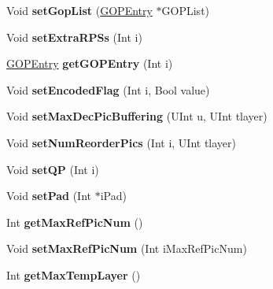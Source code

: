 \begin{DoxyCompactItemize}
\mbox{\label{class_t_enc_cfg_a10e0dcedeed1f5d039ebc30837f1358c}} 
Void {\bfseries set\+Gop\+List} (\hyperlink{struct_g_o_p_entry}{G\+O\+P\+Entry} $\ast$G\+O\+P\+List)
\item 
\mbox{\label{class_t_enc_cfg_a3f52f7b8ad563a7bc5e9ba54dee8549b}} 
Void {\bfseries set\+Extra\+R\+P\+Ss} (Int i)
\item 
\mbox{\label{class_t_enc_cfg_a65fe7b926f254fda3e9f7c6345593c65}} 
\hyperlink{struct_g_o_p_entry}{G\+O\+P\+Entry} {\bfseries get\+G\+O\+P\+Entry} (Int i)
\item 
\mbox{\label{class_t_enc_cfg_aadc1cc4e7e29b21752f9ac64053a07e4}} 
Void {\bfseries set\+Encoded\+Flag} (Int i, Bool value)
\item 
\mbox{\label{class_t_enc_cfg_a17f8ccbd8dd656f75661ea7c8efd0398}} 
Void {\bfseries set\+Max\+Dec\+Pic\+Buffering} (U\+Int u, U\+Int tlayer)
\item 
\mbox{\label{class_t_enc_cfg_a185e454643113ec9be7d532cc64f7e07}} 
Void {\bfseries set\+Num\+Reorder\+Pics} (Int i, U\+Int tlayer)
\item 
\mbox{\label{class_t_enc_cfg_adc414f03aa5cf7b8e3fdff41bdc977f7}} 
Void {\bfseries set\+QP} (Int i)
\item 
\mbox{\label{class_t_enc_cfg_ad717df9532f5d5ff505a9a421fb69053}} 
Void {\bfseries set\+Pad} (Int $\ast$i\+Pad)
\item 
\mbox{\label{class_t_enc_cfg_a99f54f5f78cc31de9cc96173dad95b75}} 
Int {\bfseries get\+Max\+Ref\+Pic\+Num} ()
\item 
\mbox{\label{class_t_enc_cfg_a0f1c7f49df72a8ee7ad77b80bfc391a8}} 
Void {\bfseries set\+Max\+Ref\+Pic\+Num} (Int i\+Max\+Ref\+Pic\+Num)
\item 
\mbox{\label{class_t_enc_cfg_a442fd23019861b2adb120093edc61de2}} 
Int {\bfseries get\+Max\+Temp\+Layer} ()
\item 
\mbox{\label{class_t_enc_cfg_ae42c05ffa243bc3798c964d065f907a9}} 

\end{DoxyCompactItemize}
